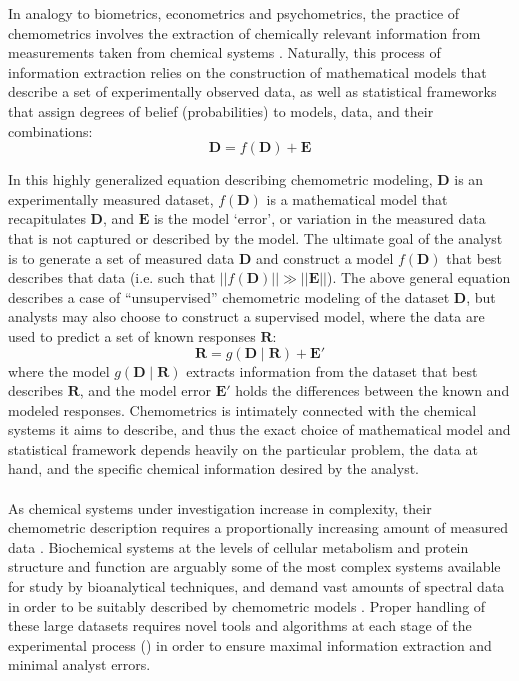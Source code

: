 \begin{doublespace}
In analogy to biometrics, econometrics and psychometrics, the practice of
chemometrics involves the extraction of chemically relevant information from
measurements taken from chemical systems \cite{wold:cils1995}.
Naturally, this process of information extraction relies on the construction of
mathematical models that describe a set of experimentally observed data, as
well as statistical frameworks that assign degrees of belief (probabilities)
to models, data, and their combinations:
\begin{equation*}
\mathbf{D} = f(\mathbf{D}) + \mathbf{E}
\end{equation*}

In this highly generalized equation describing chemometric modeling,
$\mathbf{D}$ is an experimentally measured dataset, $f(\mathbf{D})$ is
a mathematical model that recapitulates $\mathbf{D}$, and $\mathbf{E}$ is
the model `error', or variation in the measured data that is not
captured or described by the model. The ultimate goal of the analyst is to
generate a set of measured data $\mathbf{D}$ and construct a model
$f(\mathbf{D})$ that best describes that data (i.e. such that
$||f(\mathbf{D})|| \gg ||\mathbf{E}||$). The above general equation describes
a case of ``unsupervised'' chemometric modeling of the dataset $\mathbf{D}$,
but analysts may also choose to construct a supervised model, where the data
are used to predict a set of known responses $\mathbf{R}$:
\begin{equation*}
\mathbf{R} = g(\mathbf{D} \mid \mathbf{R}) + \mathbf{E}'
\end{equation*}
where the model $g(\mathbf{D} \mid \mathbf{R})$ extracts information from the
dataset that best describes $\mathbf{R}$, and the model error $\mathbf{E}'$
holds the differences between the known and modeled responses. Chemometrics
is intimately connected with the chemical systems it aims to describe, and
thus the exact choice of mathematical model and statistical framework depends
heavily on the particular problem, the data at hand, and the specific chemical
information desired by the analyst.
\\\\
As chemical systems under investigation increase in complexity, their
chemometric description requires a proportionally increasing amount of
measured data \cite{wold:cils1995}. Biochemical systems at the
levels of cellular metabolism and protein structure and function are
arguably some of the most complex systems available for study by
bioanalytical techniques, and demand vast amounts of spectral data
in order to be suitably described by chemometric models
\cite{
  wutrich:jmolb1982,
  kay:jmr2005,
  lindon:cmr2000,
  chen:rcms2006,
  han:metab2008,
  barding:jacs2012,
  baker:mmbio2012,
  marshall:metab2015}. Proper handling of these large datasets requires novel
tools and algorithms at each stage of the experimental process
() in order to ensure maximal information extraction
and minimal analyst errors.
\end{doublespace}


